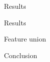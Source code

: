 \documentclass{beamer}
\begin{document}
\begin{frame}{Results}

\end{frame}
\begin{frame}{Results}

\end{frame}
\begin{frame}{Feature union}

\end{frame}
\begin{frame}{Conclusion}

\end{frame}
\end{document}
